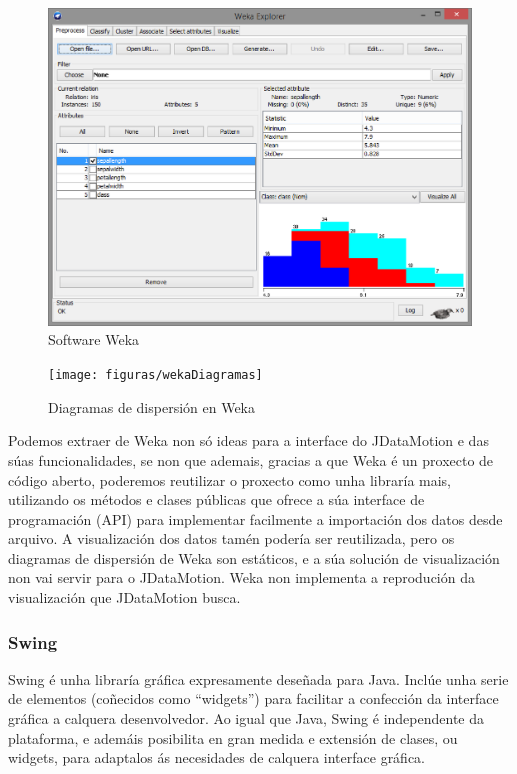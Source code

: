 \begin{figure}
\centering
\includegraphics[width=\textwidth,height=\textheight,keepaspectratio]{figuras/weka}
\caption{Software Weka}
\label{weka}
\end{figure}

\begin{figure}
\centering
\texttt{[image: figuras/wekaDiagramas]}
\caption{Diagramas de dispersión en Weka}
\label{wekaDiagramas}
\end{figure}

Podemos extraer de Weka non só ideas para a interface do JDataMotion e das súas funcionalidades, se non que ademais, gracias a que Weka é un proxecto de código aberto, poderemos reutilizar o proxecto como unha libraría mais, utilizando os métodos e clases públicas que ofrece a súa interface de programación (API) para implementar facilmente a importación dos datos desde arquivo. A visualización dos datos tamén podería ser reutilizada, pero os diagramas de dispersión de Weka son estáticos, e a súa solución de visualización non vai servir para o JDataMotion. Weka non implementa a reprodución da visualización que JDataMotion busca.

\subsubsection{Swing}

Swing é unha libraría gráfica expresamente deseñada para Java. Inclúe unha serie de elementos (coñecidos como ``widgets'') para facilitar a confección da interface gráfica a calquera desenvolvedor. Ao igual que Java, Swing é independente da plataforma, e ademáis posibilita en gran medida e extensión de clases, ou widgets, para adaptalos ás necesidades de calquera interface gráfica.

